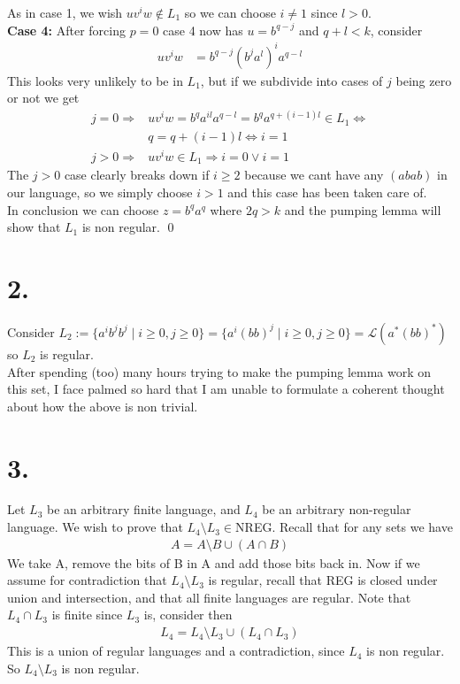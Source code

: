 \documentclass{article}
\theoremstyle{remark}
\numberwithin{equation}{section}
\begin{document}
As in case 1, we wish $uv^iw\notin L_1$ so we can choose $i\neq 1$ since $l>0$.
\\\textbf{Case 4:} After forcing $p=0$ case 4 now has $u = b^{q-j}$ and $q+l<k$, consider
\begin{align*}
	uv^iw &= b^{q-j} (b^{j}a^{l})^i a^{q-l}
\end{align*}
This looks very unlikely to be in $L_1$, but if we subdivide into cases of $j$ being zero or not we get
\begin{align*}
	j = 0 \Rightarrow& uv^iw = b^{q} a^{il} a^{q-l} = b^qa^{q+(i-1)l} \in L_1 \iff \\
					 & q = q+(i-1)l \iff i=1\\
	j > 0 \Rightarrow& uv^iw \in L_1 \Rightarrow i = 0 \vee i = 1 
\end{align*}
The $j>0$ case clearly breaks down if $i\geq 2$ because we cant have any $(abab)$ in our language, so we simply choose $i>1$ and this case has been taken care of.\\
In conclusion we can choose $z = b^qa^q$ where $2q>k$ and the pumping lemma will show that $L_1$ is non regular. \qed  
\section*{2.}
Consider $L_2 := \{ a^i b^jb^j \mid i\geq 0, j\geq 0 \} = \{ a^i (bb)^{j} \mid i\geq 0, j\geq 0 \} = \mathcal{L}(a^*(bb)^*)$ so $L_2$ is regular.\\
After spending (too) many hours trying to make the pumping lemma work on this set, I face palmed so hard that I am unable to formulate a coherent thought about how the above is non trivial.
\section*{3.}
Let $L_3$ be an arbitrary finite language, and $L_4$ be an arbitrary non-regular language. We wish to prove that $L_4\setminus L_3\in$NREG. Recall that for any sets we have
\begin{align*}
A = A\setminus B \cup (A \cap B)
\end{align*}
We take A, remove the bits of B in A and add those bits back in. Now if we assume for contradiction that $L_4\setminus L_3$ is regular, recall that REG is closed under union and intersection, and that all finite languages are regular. Note that $L_4 \cap L_3$ is finite since $L_3$ is, consider then
\begin{align*}
	L_4 = L_4\setminus L_3 \cup (L_4 \cap L_3)
\end{align*}
This is a union of regular languages and a contradiction, since $L_4$ is non regular. So $L_4\setminus L_3$ is non regular.
\end{document}
